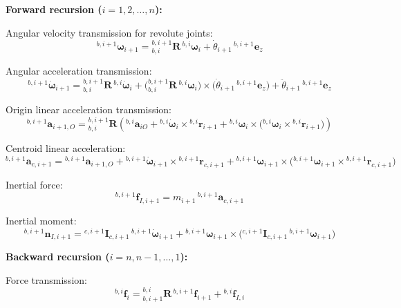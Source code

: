 \documentclass[12pt,a4paper]{report}
\newcommand{\vect}[1]{\mathbf{#1}}
\newcommand{\mat}[1]{\mathbf{#1}}
\newcommand{\angvel}{\boldsymbol{\omega}}
\begin{document}
\textbf{Forward recursion ($i = 1, 2, \ldots, n$):}

Angular velocity transmission for revolute joints:
\begin{equation}
{}^{b,i+1}\angvel_{i+1}
=
{}_{b,i}^{b,i+1}\mat{R}\,{}^{b,i}\angvel_{i}
+
\dot{\theta}_{i+1}\,{}^{b,i+1}\vect{e}_{z}
\end{equation}

Angular acceleration transmission:
\begin{equation}
{}^{b,i+1}\dot{\angvel}_{i+1}
=
{}_{b,i}^{b,i+1}\mat{R}\,{}^{b,i}\dot{\angvel}_{i}
+
\bigl({}_{b,i}^{b,i+1}\mat{R}\,{}^{b,i}\angvel_{i}\bigr)
\times
\bigl(\dot{\theta}_{i+1}\,{}^{b,i+1}\vect{e}_{z}\bigr)
+
\ddot{\theta}_{i+1}\,{}^{b,i+1}\vect{e}_{z}
\end{equation}

Origin linear acceleration transmission:
\begin{equation}
{}^{b,i+1}\vect{a}_{i+1,O}
=
{}_{b,i}^{b,i+1}\mat{R}
\left(
{}^{b,i}\vect{a}_{iO}
+
{}^{b,i}\dot{\angvel}_{i} \times {}^{b,i}\vect{r}_{i+1}
+
{}^{b,i}\angvel_{i} \times \bigl({}^{b,i}\angvel_{i} \times {}^{b,i}\vect{r}_{i+1}\bigr)
\right)
\end{equation}

Centroid linear acceleration:
\begin{equation}
{}^{b,i+1}\vect{a}_{c,i+1}
=
{}^{b,i+1}\vect{a}_{i+1,O}
+
{}^{b,i+1}\dot{\angvel}_{i+1} \times {}^{b,i+1}\vect{r}_{c,i+1}
+
{}^{b,i+1}\angvel_{i+1} \times
\bigl(
{}^{b,i+1}\angvel_{i+1} \times {}^{b,i+1}\vect{r}_{c,i+1}
\bigr)
\end{equation}

Inertial force:
\begin{equation}
{}^{b,i+1}\vect{f}_{I,i+1}
=
m_{i+1}\,{}^{b,i+1}\vect{a}_{c,i+1}
\end{equation}

Inertial moment:
\begin{equation}
{}^{b,i+1}\vect{n}_{I,i+1}
=
{}^{c,i+1}\mat{I}_{c,i+1}\,{}^{b,i+1}\dot{\angvel}_{i+1}
+
{}^{b,i+1}\angvel_{i+1} \times
\bigl(
{}^{c,i+1}\mat{I}_{c,i+1}\,{}^{b,i+1}\angvel_{i+1}
\bigr)
\end{equation}

\textbf{Backward recursion ($i = n, n-1, \ldots, 1$):}

Force transmission:
\begin{equation}
{}^{b,i}\vect{f}_{i}
=
{}_{b,i+1}^{b,i}\mat{R}\,{}^{b,i+1}\vect{f}_{i+1}
+
{}^{b,i}\vect{f}_{I,i}
\end{equation}
\end{document}
